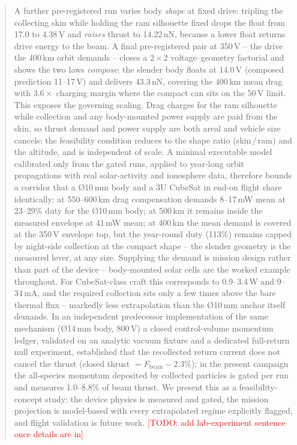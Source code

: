 \documentclass[11pt]{article}
\newcommand{\todo}[1]{\textcolor{red}{[TODO: #1]}}
\begin{document}
\begin{abstract}
A further pre-registered run varies body
\emph{shape} at fixed drive: tripling the collecting skin while holding the
ram silhouette fixed drops the float from 17.0 to 4.38\,V and \emph{raises}
thrust to 14.22\,nN, because a lower float returns drive energy to the beam.
A final pre-registered pair at 350\,V -- the drive the 400\,km orbit
demands -- closes a $2{\times}2$ voltage--geometry factorial and shows the
two laws \emph{compose}: the slender body floats at 14.0\,V (composed
prediction 11--17\,V) and delivers 43.3\,nN, covering the 400\,km mean
drag with $3.6\times$ charging margin where the compact can sits on the
50\,V limit. This exposes the governing scaling. Drag charges for the ram silhouette while
collection and any body-mounted power supply are paid from the skin, so
thrust demand and
power supply are both areal and vehicle size cancels: the feasibility
condition reduces to the shape ratio (skin\,/\,ram) and the altitude, and is
independent of scale. A minimal executable model calibrated only from the
gated runs, applied to year-long orbit propagations with real solar-activity
and ionosphere data, therefore bounds a corridor that a \O10\,mm body and a
3U CubeSat in end-on flight share identically: at 550--600\,km drag
compensation demands 8--17\,mW mean at 23--29\% duty for the \O10\,mm body;
at 500\,km it remains inside the measured envelope at 41\,mW mean; at
400\,km the mean demand is covered at the 350\,V envelope top, but the
year-round duty (113\%) remains capped by night-side collection at the
compact shape -- the slender geometry is the measured lever, at any size. Supplying the demand is mission design rather than part of the
device -- body-mounted solar cells are the worked example throughout. For
CubeSat-class craft this corresponds to 0.9--3.4\,W and 9--34\,mA, and the
required collection sits only a few times above the bare thermal flux --
markedly less extrapolation than the \O10\,mm anchor itself demands. In an independent predecessor implementation of the same mechanism
(\O14\,mm body, 800\,V) a closed control-volume momentum ledger, validated
on an analytic vacuum fixture and a dedicated full-return null experiment,
established that the recollected return current does not cancel the thrust
(closed thrust $= F_{\mathrm{beam}} - 2.3\%$); in the present campaign the
all-species momentum deposited by collected particles is gated per run and
measures 1.0--8.8\% of beam thrust. We present this as a
feasibility-concept study: the device physics is measured and gated, the
mission projection is model-based with every extrapolated regime explicitly
flagged, and flight validation is future work.
\todo{add lab-experiment sentence once details are in}
\end{abstract}
\end{document}
